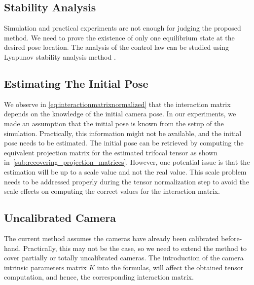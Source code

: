 \subsection{Stability Analysis}
Simulation and practical experiments are not enough for judging the proposed method. We need to prove the existence of only one equilibrium state at the desired pose location. The analysis of the control law can be studied using Lyapunov stability analysis method \cite{spong2006robot}.
\vspace{-1em}
\subsection{Estimating The Initial Pose}
We observe in \eqref{eq:interactionmatrixnormalized} that the interaction matrix depends on the knowledge of the initial camera pose. In our experiments, we made an assumption that the initial pose is known from the setup of the simulation. Practically, this information might not be available, and the initial pose needs to be estimated. The initial pose can be retrieved by computing the equivalent projection matrix for the estimated trifocal tensor as shown in~\ref{sub:recovering_projection_matrices}. However, one potential issue is that the estimation will be up to a scale value and not the real value. This scale problem needs to be addressed properly during the tensor normalization step to avoid the scale effects on computing the correct values for the interaction matrix.
\vspace{-1em}
\subsection{Uncalibrated Camera}
The current method assumes the cameras have already been calibrated before-hand. Practically, this may not be the case, so we need to extend the method to cover partially or totally uncalibrated cameras. The introduction of the camera intrinsic parameters matrix $K$ into the formulas, will affect the obtained tensor computation, and hence, the corresponding interaction matrix.
